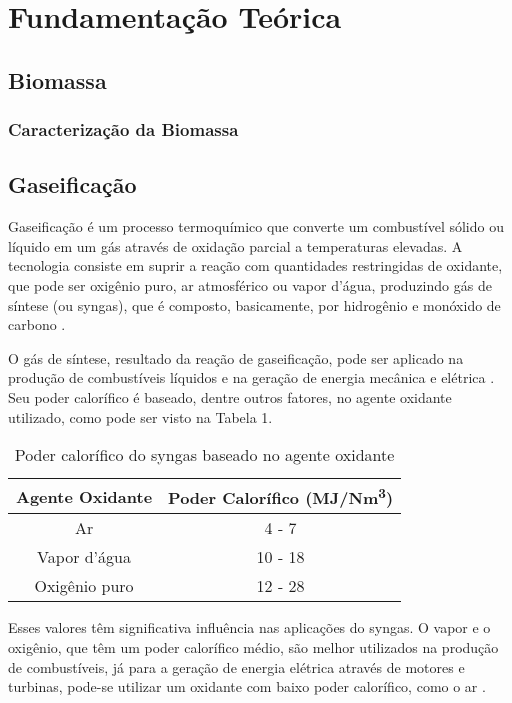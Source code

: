\chapter[Fundamentação Teórica]{Fundamentação Teórica}

\section{Biomassa}

\subsection{Caracterização da Biomassa}

\section{Gaseificação}

Gaseificação é um processo termoquímico que converte um combustível sólido ou líquido em um gás através de oxidação parcial a temperaturas elevadas. A tecnologia consiste em suprir a reação com quantidades restringidas de oxidante, que pode ser oxigênio puro, ar atmosférico ou vapor d’água, produzindo gás de síntese (ou syngas), que é composto, basicamente, por hidrogênio e monóxido de carbono \cite{biomassacortez}.

O gás de síntese, resultado da reação de gaseificação, pode ser aplicado na produção de combustíveis líquidos e na geração de energia mecânica e elétrica \cite{biomassacortez}. Seu poder calorífico é baseado, dentre outros fatores, no agente oxidante utilizado, como pode ser visto na Tabela 1.

\begin{table}[h]
	\centering
	\caption{Poder calorífico do syngas baseado no agente oxidante \cite{basu2010}}
	\begin{tabular}{c|c}
		\textbf{Agente Oxidante} & \textbf{Poder Calorífico (MJ/Nm\textsuperscript{3})} \\
		\hline
		Ar & 4 - 7 \\
		Vapor d'água & 10 - 18 \\
		Oxigênio puro & 12 - 28 
	\end{tabular}
\end{table}	
		
		

Esses valores têm significativa influência nas aplicações do syngas. O vapor e o oxigênio, que têm um poder calorífico médio, são melhor utilizados na produção de combustíveis, já para a geração de energia elétrica através de motores e turbinas, pode-se utilizar um oxidante com baixo poder calorífico, como o ar \cite{bridgwater2003}.

